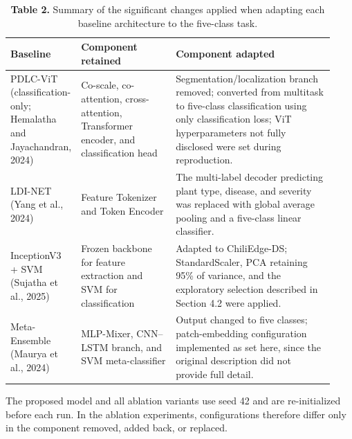 \begin{table}[!tb]
\centering
\caption*{\textbf{Table 2.} Summary of the significant changes applied when adapting each baseline architecture to the five-class task.}
\label{tab:2}
\footnotesize
\renewcommand{\arraystretch}{1.3}
\begin{tabular}{>{\raggedright\arraybackslash}p{0.13\linewidth} >{\raggedright\arraybackslash}p{0.30\linewidth} >{\raggedright\arraybackslash}p{0.50\linewidth}}
\toprule
\textbf{Baseline} & \textbf{Component retained} & \textbf{Component adapted} \\
\midrule
PDLC-ViT (classification-only; Hemalatha and Jayachandran, 2024) & Co-scale, co-attention, cross-attention, Transformer encoder, and classification head & Segmentation/localization branch removed; converted from multitask to five-class classification using only classification loss; ViT hyperparameters not fully disclosed were set during reproduction. \\
LDI-NET (Yang et al., 2024) & Feature Tokenizer and Token Encoder & The multi-label decoder predicting plant type, disease, and severity was replaced with global average pooling and a five-class linear classifier. \\
InceptionV3 + SVM (Sujatha et al., 2025) & Frozen backbone for feature extraction and SVM for classification & Adapted to ChiliEdge-DS; StandardScaler, PCA retaining 95\% of variance, and the exploratory selection described in Section 4.2 were applied. \\
Meta-Ensemble (Maurya et al., 2024) & MLP-Mixer, CNN--LSTM branch, and SVM meta-classifier & Output changed to five classes; patch-embedding configuration implemented as set here, since the original description did not provide full detail. \\
\bottomrule
\end{tabular}
\end{table}

The proposed model and all ablation variants use seed 42 and are re-initialized before each run. In the ablation experiments, configurations therefore differ only in the component removed, added back, or replaced.

